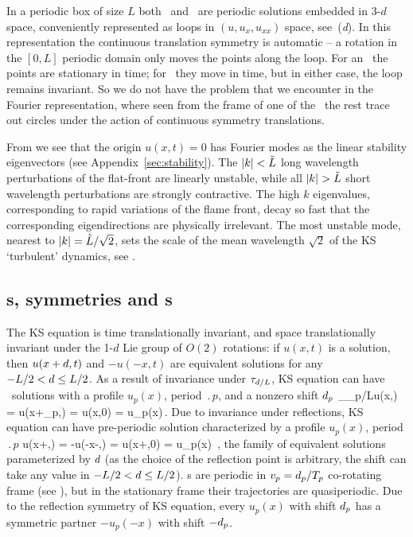 {In a periodic box of size $L$
both \eqva\ and \reqva\ are  periodic solutions
embedded in 3-$d$ space, conveniently represented as loops in
$(u,u_x,u_{xx})$ space, see \,(\textit{d}).
In this representation the continuous translation symmetry
is automatic -- a rotation in the $[0,L]$ periodic domain only
moves the points along the loop. For an \eqv\ the points
are stationary in time; for \reqv\ they move in time, but in
either case, the loop remains invariant.
So we do not have the problem that we encounter in the Fourier
representation, where seen from the frame of one of the \eqva\
the rest trace out circles under the action of continuous symmetry
translations.

From  we see that the origin $u(x,t) = 0$
has Fourier modes as the linear stability eigenvectors
(see Appendix~\ref{sec:stability}).  The $|k|<\tilde{L}$
long wavelength perturbations of the flat-front {\eqv}
are linearly unstable, while all
$|k|> \tildeL$ short wavelength perturbations are strongly contractive.
The high $k$ eigenvalues, corresponding to rapid variations of
the flame front, decay so fast that the corresponding eigendirections
are physically irrelevant.
The most unstable mode, nearest to $|k|=\tilde{L}/\sqrt{2}$,
sets the scale of the mean wavelength $\sqrt{2}$
of the KS `turbulent' dynamics,
see .



\subsection{\Rpo s, symmetries and \po s} \label{sec:KSePO}

The KS equation  is time translationally invariant, and
space translationally invariant under the 1-$d$ Lie group of $O(2)$
rotations: if $u(x,t)$ is a solution, then $u(x+d,t)$ and
$-u(-x,t)$ are equivalent solutions for any $-L/2 < d \leq
L/2$.
As a result of invariance under $\tau_{d/L}$,
KS equation can have \rpo\ solutions
with a profile $u_p(x)$, period $\period{p}$, and a
nonzero shift $d_p$
\beq
  \Shift_{\shift_p/L}u(x,) =
  u(x+\shift_p,\period{p}) = u(x,0) = u_p(x)\,.
\label{KSrpos}
\eeq
Due to invariance under reflections, KS equation can have
pre-periodic solution
characterized by a profile $u_p(x)$,
period $\period{p}$
\beq
  \Refl u(x+\shift,) =
  -u(-x-\shift,\period{p}) = u(x+\shift,0) = u_p(x)
  \,,
\label{KSpos}
\eeq
the family of equivalent solutions
parameterized by $d$
(as the choice of the reflection point is arbitrary,
the shift can take any value in $-L/2 < d \leq L/2$).
{\Rpo s}  are periodic in
$v_p=d_p/{T_{p}}$ co-rotating frame (see
), but in the stationary frame their
trajectories are quasiperiodic.  Due to the reflection symmetry
 of KS equation, every {\rpo} $u_p(x)$ with shift
$d_p$ has a symmetric partner $-u_p(-x)$ with shift $-d_p$.

}
